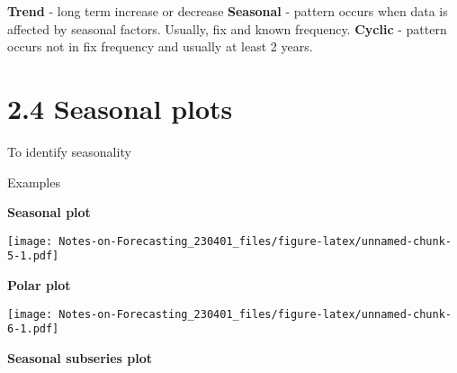 \documentclass[
]{article}
\newenvironment{Shaded}{\begin{snugshade}}{\end{snugshade}}
\newcommand{\AttributeTok}[1]{\textcolor[rgb]{0.77,0.63,0.00}{#1}}
\newcommand{\ConstantTok}[1]{\textcolor[rgb]{0.00,0.00,0.00}{#1}}
\newcommand{\FunctionTok}[1]{\textcolor[rgb]{0.00,0.00,0.00}{#1}}
\newcommand{\NormalTok}[1]{#1}
\newcommand{\SpecialCharTok}[1]{\textcolor[rgb]{0.00,0.00,0.00}{#1}}
\newcommand{\StringTok}[1]{\textcolor[rgb]{0.31,0.60,0.02}{#1}}
\begin{document}
\textbf{Trend} - long term increase or decrease \textbf{Seasonal} -
pattern occurs when data is affected by seasonal factors. Usually, fix
and known frequency. \textbf{Cyclic} - pattern occurs not in fix
frequency and usually at least 2 years.

\hypertarget{seasonal-plots}{%
\section{2.4 Seasonal plots}\label{seasonal-plots}}

To identify seasonality

Examples

\textbf{Seasonal plot}

\begin{Shaded}
\end{Shaded}

\texttt{[image: Notes-on-Forecasting\_230401\_files/figure-latex/unnamed-chunk-5-1.pdf]}

\textbf{Polar plot}

\begin{Shaded}
\end{Shaded}

\texttt{[image: Notes-on-Forecasting\_230401\_files/figure-latex/unnamed-chunk-6-1.pdf]}

\textbf{Seasonal subseries plot}

\begin{Shaded}
\end{Shaded}
\end{document}
